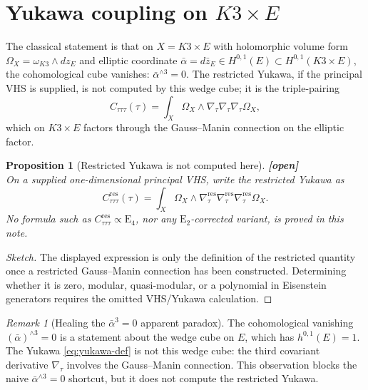 \documentclass[11pt]{article}
\theoremstyle{plain}
\newtheorem{proposition}[theorem]{Proposition}
\theoremstyle{definition}
\theoremstyle{remark}
\newtheorem{remark}[theorem]{Remark}
\providecommand{\Eis}{\mathrm{E}}
\providecommand{\ClaimStatusOpen}[1][]{\textbf{[open]}}
\begin{document}
\section{Yukawa coupling on $K3\times E$}
\label{sec:yukawa}

The classical statement is that on $X = K3\times E$ with holomorphic
volume form $\Omega_X = \omega_{K3}\wedge dz_E$ and elliptic
coordinate $\bar\alpha = d\bar z_E\in H^{0,1}(E)\subset
H^{0,1}(K3\times E)$, the cohomological cube vanishes:
$\bar\alpha^{\wedge 3} = 0$. The restricted Yukawa, if the principal
VHS is supplied, is not computed by this wedge cube; it is the
triple-pairing
\begin{equation}
\label{eq:yukawa-def}
C_{\tau\tau\tau}(\tau)
= \int_X \Omega_X \wedge \nabla_\tau\nabla_\tau\nabla_\tau \Omega_X,
\end{equation}
which on $K3\times E$ factors through the Gauss--Manin connection on
the elliptic factor.

\begin{proposition}[Restricted Yukawa is not computed here]
\label{prop:yukawa-k3xe}
\ClaimStatusOpen{}\\
On a supplied one-dimensional principal VHS, write the restricted
Yukawa as
\[
C_{\tau\tau\tau}^{\mathrm{res}}(\tau)
= \int_X \Omega_X \wedge
  \nabla_\tau^{\mathrm{res}}\nabla_\tau^{\mathrm{res}}
  \nabla_\tau^{\mathrm{res}}\Omega_X .
\]
No formula such as $C_{\tau\tau\tau}^{\mathrm{res}}\propto \Eis_4$,
nor any $\Eis_2$-corrected variant, is proved in this note.
\end{proposition}

\begin{proof}[Sketch]
The displayed expression is only the definition of the restricted
quantity once a restricted Gauss--Manin connection has been constructed.
Determining whether it is zero, modular, quasi-modular, or a polynomial
in Eisenstein generators requires the omitted VHS/Yukawa calculation.
\end{proof}

\begin{remark}[Healing the $\bar\alpha^3 = 0$ apparent paradox]
\label{rem:cubic-vanish-fix}
The cohomological vanishing $(\bar\alpha)^{\wedge 3}=0$ is a statement
about the wedge cube on $E$, which has $h^{0,1}(E)=1$. The Yukawa
\eqref{eq:yukawa-def} is not this wedge cube: the third covariant
derivative $\nabla_\tau$ involves the Gauss--Manin connection. This
observation blocks the naive $\bar\alpha^{\wedge 3}=0$ shortcut, but it
does not compute the restricted Yukawa.
\end{remark}
\end{document}
